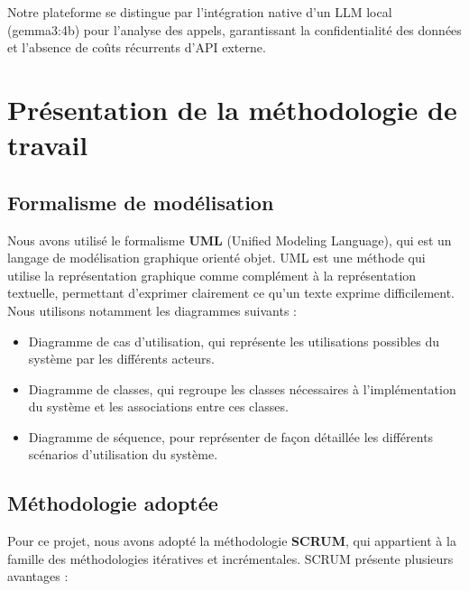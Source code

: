 Notre plateforme se distingue par l'intégration native d'un LLM local (gemma3:4b) pour
l'analyse des appels, garantissant la confidentialité des données et l'absence de coûts
récurrents d'API externe.

\section{Présentation de la méthodologie de travail}
\label{sec:chap1_methodologie_travail}

\subsection{Formalisme de modélisation}

Nous avons utilisé le formalisme \textbf{UML} (Unified Modeling Language), qui est un langage de
modélisation graphique orienté objet. UML est une méthode qui utilise la représentation graphique
comme complément à la représentation textuelle, permettant d'exprimer clairement ce qu'un texte
exprime difficilement. Nous utilisons notamment les diagrammes suivants :

\begin{itemize}
    \item Diagramme de cas d'utilisation, qui représente les utilisations possibles du système
          par les différents acteurs.
    \item Diagramme de classes, qui regroupe les classes nécessaires à l'implémentation du
          système et les associations entre ces classes.
    \item Diagramme de séquence, pour représenter de façon détaillée les différents scénarios
          d'utilisation du système.
\end{itemize}

\subsection{Méthodologie adoptée}

Pour ce projet, nous avons adopté la méthodologie \textbf{SCRUM}, qui appartient à la famille
des méthodologies itératives et incrémentales. SCRUM présente plusieurs avantages :
\cite{ScrumGuide}

